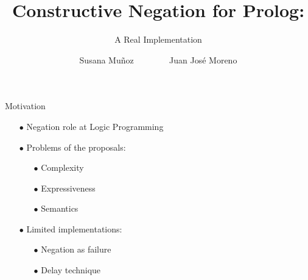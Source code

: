 \documentclass[pdf,slideColor,contemporain]{prosper}
\title{Constructive Negation for Prolog:}
\subtitle{A Real Implementation}
\author{Susana Mu\~{n}oz ~~~~~~~ Juan Jos\'{e} Moreno}
\begin{document}
\maketitle

\begin{slide}{Motivation}
     \begin{itemize}
        \item[{\blue $\bullet$}] Negation {\blue role} at Logic Programming
        \item[{\blue $\bullet$}] Problems of the {\blue proposals}:
              \begin{itemize}
                \item[$\bullet$] Complexity
                \item[$\bullet$] Expressiveness
                \item[$\bullet$] Semantics
              \end{itemize}
        \item[{\blue $\bullet$}] Limited {\blue implementations}:
              \begin{itemize}
                \item[$\bullet$] Negation as failure
                \item[$\bullet$] Delay technique
              \end{itemize}
     \end{itemize}
\end{slide}
\end{document}
